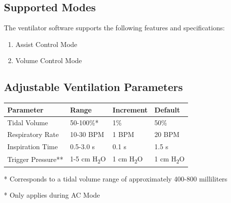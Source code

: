 \documentclass[]{article}
\begin{document}
\subsection{Supported Modes}

The ventilator software supports the following features and specifications:
\begin{enumerate}
	\item Assist Control Mode
	\item Volume Control Mode
\end{enumerate}




\subsection{Adjustable Ventilation Parameters}


\begin{center}
	\begin{tabular}{ |p{3.8cm}| p{2.2cm}| p{2.2cm}|p{2.2cm}|}
		\hline
		\textbf{Parameter} & \textbf{Range} & \textbf{Increment}& \textbf{Default} \\
		\hline 
		Tidal Volume & 50-100\%* & 1\% & 50\% \\  
		\hline
		Respiratory Rate & 10-30 BPM  & 1 BPM & 20 BPM \\ 
		\hline   
		Inspiration Time & 0.5-3.0 s& 0.1 s & 1.5 s\\
		\hline
		Trigger Pressure** & 1-5 cm H\textsubscript{2}O & 1 cm H\textsubscript{2}O& 1 cm H\textsubscript{2}O \\
		\hline
	\end{tabular}
	
\end{center}
* Corresponds to a tidal volume range of approximately 400-800 milliliters

\noindent ** Only applies during AC Mode
\end{document}
